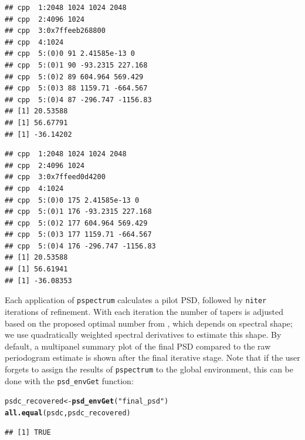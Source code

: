 \documentclass[10pt]{article}\usepackage[]{graphicx}\usepackage[]{color}
\makeatletter
\newcommand{\hlstr}[1]{\textcolor[rgb]{0.192,0.494,0.8}{#1}}%
\newcommand{\hlstd}[1]{\textcolor[rgb]{0.345,0.345,0.345}{#1}}%
\newcommand{\hlkwb}[1]{\textcolor[rgb]{0.69,0.353,0.396}{#1}}%
\newcommand{\hlkwd}[1]{\textcolor[rgb]{0.737,0.353,0.396}{\textbf{#1}}}%
\newenvironment{kframe}{%
 \def\at@end@of@kframe{}%
 \ifinner\ifhmode%
  \def\at@end@of@kframe{\end{minipage}}%
  \begin{minipage}{\columnwidth}%
 \fi\fi%
 \def\FrameCommand##1{\hskip\@totalleftmargin \hskip-\fboxsep
 \colorbox{shadecolor}{##1}\hskip-\fboxsep
     \hskip-\linewidth \hskip-\@totalleftmargin \hskip\columnwidth}%
 \MakeFramed {\advance\hsize-\width
   \@totalleftmargin\z@ \linewidth\hsize
   \@setminipage}}%
 {\par\unskip\endMakeFramed%
 \at@end@of@kframe}
\newenvironment{knitrout}{}{} %
\newcommand{\Rcmd}[1]{\texttt{#1}}
\makeatother
\begin{document}
\begin{knitrout}
\begin{kframe}
{\ttfamily\noindent\itshape\color{messagecolor}{\#\# Stage\ \ 1 est. (Ave. S.V.R. -15.1 dB) \\\#\# f creation}}\begin{verbatim}
## cpp  1:2048 1024 1024 2048
## cpp  2:4096 1024
## cpp  3:0x7ffeeb268800
## cpp  4:1024
## cpp  5:(0)0 91 2.41585e-13 0
## cpp  5:(0)1 90 -93.2315 227.168
## cpp  5:(0)2 89 604.964 569.429
## cpp  5:(0)3 88 1159.71 -664.567
## cpp  5:(0)4 87 -296.747 -1156.83
## [1] 20.53588
## [1] 56.67791
## [1] -36.14202
\end{verbatim}


{\ttfamily\noindent\itshape\color{messagecolor}{\#\# Stage\ \ 2 est. (Ave. S.V.R. -22.6 dB) \\\#\# f creation}}\begin{verbatim}
## cpp  1:2048 1024 1024 2048
## cpp  2:4096 1024
## cpp  3:0x7ffeed0d4200
## cpp  4:1024
## cpp  5:(0)0 175 2.41585e-13 0
## cpp  5:(0)1 176 -93.2315 227.168
## cpp  5:(0)2 177 604.964 569.429
## cpp  5:(0)3 177 1159.71 -664.567
## cpp  5:(0)4 176 -296.747 -1156.83
## [1] 20.53588
## [1] 56.61941
## [1] -36.08353
\end{verbatim}


{\ttfamily\noindent\itshape\color{messagecolor}{\#\# Stage\ \ 3 est. (Ave. S.V.R. -26.8 dB) \\\#\# Normalized\ \ single-sided PSD\ \ (PSD)\ \ to single-sided PSD for sampling-freq.\ \ 1}}\end{kframe}
\end{knitrout}
Each application of \Rcmd{pspectrum} calculates a pilot PSD, followed by 
\Rcmd{niter}
iterations of refinement.
With each iteration
the number of tapers is adjusted 
based on the proposed optimal number from \citet{rs1995}, which
depends on spectral shape; we use 
quadratically weighted spectral derivatives \citep{prieto2007}
to estimate this shape.
By default, a multipanel summary plot of the final PSD compared
to the raw periodogram estimate is shown after the final iterative stage.
Note that if the user forgets to assign the results of
\Rcmd{pspectrum} to the global environment, this can be
done with the \Rcmd{psd\_envGet} function:
\begin{knitrout}\small
{}\color{fgcolor}\begin{kframe}
\begin{alltt}
\hlstd{psdc_recovered} \hlkwb{<-} \hlkwd{psd_envGet}\hlstd{(}\hlstr{"final_psd"}\hlstd{)}
\hlkwd{all.equal}\hlstd{(psdc, psdc_recovered)}
\end{alltt}
\begin{verbatim}
## [1] TRUE
\end{verbatim}
\end{kframe}
\end{knitrout}
\end{document}
